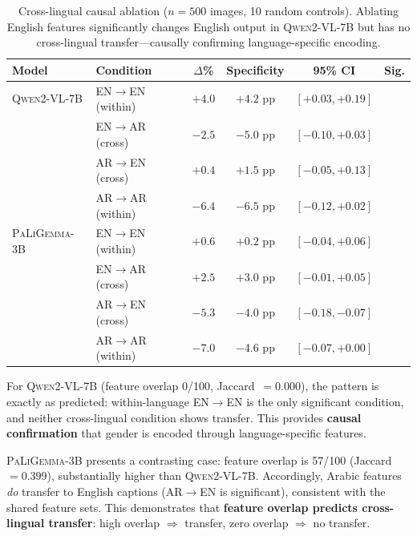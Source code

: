 \documentclass[11pt,a4paper]{article}
\newcommand{\cmark}{\ding{51}}
\newcommand{\xmark}{\ding{55}}
\newcommand{\modelname}[1]{\textsc{#1}}
\newcommand{\pali}{\modelname{PaLiGemma-3B}}
\newcommand{\qwen}{\modelname{Qwen2-VL-7B}}
\begin{document}
\begin{table}[h]
\centering
\small
\caption{Cross-lingual causal ablation ($n = 500$ images, 10 random controls).
Ablating English features significantly changes English output in \qwen{} but has no cross-lingual transfer---causally confirming language-specific encoding.}
\label{tab:crosslingual_ablation}
\begin{tabular}{@{}llcccc@{}}
\toprule
\textbf{Model} & \textbf{Condition} & \textbf{$\Delta$\%} & \textbf{Specificity} & \textbf{95\% CI} & \textbf{Sig.} \\
\midrule
\qwen{} & EN$\to$EN (within) & $+4.0$ & $+4.2$ pp & $[+0.03, +0.19]$ & \cmark \\
            & EN$\to$AR (cross) & $-2.5$ & $-5.0$ pp & $[-0.10, +0.03]$ & \xmark \\
            & AR$\to$EN (cross) & $+0.4$ & $+1.5$ pp & $[-0.05, +0.13]$ & \xmark \\
            & AR$\to$AR (within) & $-6.4$ & $-6.5$ pp & $[-0.12, +0.02]$ & \xmark \\
\midrule
\pali{}  & EN$\to$EN (within) & $+0.6$ & $+0.2$ pp & $[-0.04, +0.06]$ & \xmark \\
            & EN$\to$AR (cross) & $+2.5$ & $+3.0$ pp & $[-0.01, +0.05]$ & \xmark \\
            & AR$\to$EN (cross) & $-5.3$ & $-4.0$ pp & $[-0.18, -0.07]$ & \cmark \\
            & AR$\to$AR (within) & $-7.0$ & $-4.6$ pp & $[-0.07, +0.00]$ & \xmark \\
\bottomrule
\end{tabular}
\end{table}

For \qwen{} (feature overlap 0/100, Jaccard~$= 0.000$), the pattern is exactly as predicted: within-language EN$\to$EN is the only significant condition, and neither cross-lingual condition shows transfer.
This provides \textbf{causal confirmation} that gender is encoded through language-specific features.

\pali{} presents a contrasting case: feature overlap is 57/100 (Jaccard~$= 0.399$), substantially higher than \qwen{}.
Accordingly, Arabic features \emph{do} transfer to English captions (AR$\to$EN is significant), consistent with the shared feature sets.
This demonstrates that \textbf{feature overlap predicts cross-lingual transfer}: high overlap $\Rightarrow$ transfer, zero overlap $\Rightarrow$ no transfer.

\end{document}
